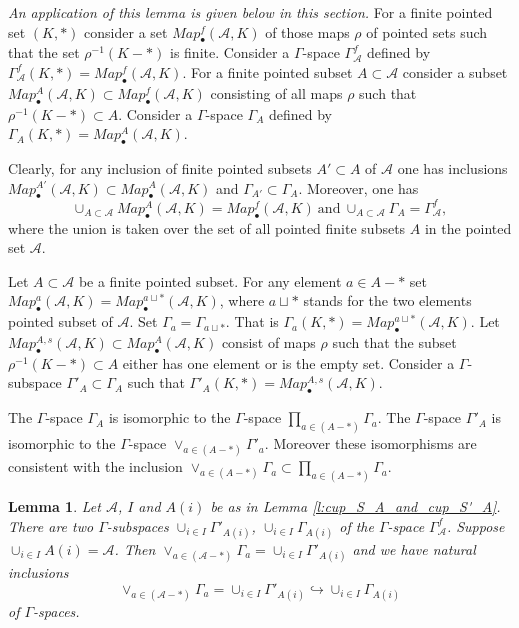 \documentclass[a4paper,11pt,reqno]{amsart}
\newtheorem{lemma}[theorem]{Lemma}
\begin{document}
{\it An application of this lemma is given below in this section.}
For a finite pointed set $(K,*)$ consider a set
$Map^f_\bullet(\mathcal A,K)$
of those maps $\rho$ of pointed sets such that the set $\rho^{-1}(K-*)$ is finite.
Consider a $\Gamma$-space $\Gamma^f_{\mathcal A}$ defined by
$\Gamma^f_{\mathcal A}(K,*)=Map^f_\bullet(\mathcal A,K)$.
For a finite pointed subset $A\subset \mathcal A$ consider a subset
$Map^A_\bullet(\mathcal A,K)\subset Map^f_\bullet(\mathcal A,K)$
consisting of all maps $\rho$ such that $\rho^{-1}(K-*)\subset A$.
Consider a $\Gamma$-space $\Gamma_{A}$ defined by
$\Gamma_{A}(K,*)=Map^A_\bullet(\mathcal A,K)$.

Clearly, for any inclusion of finite pointed subsets $A'\subset A$ of $\mathcal A$ one has inclusions
$Map^{A'}_\bullet(\mathcal A,K)\subset Map^A_\bullet(\mathcal A,K)$
and $\Gamma_{A'}\subset \Gamma_{A}$. Moreover, one has
   $$\cup_{A\subset \mathcal A}Map^A_\bullet(\mathcal A,K)=Map^f_\bullet(\mathcal A,K) \ \text{and} \
\cup_{A\subset \mathcal A}\Gamma_{A}=\Gamma^f_{\mathcal A},$$
where the union is taken over the set of all pointed finite subsets $A$ in the pointed set
$\mathcal A$.

Let $A\subset \mathcal A$ be a finite pointed subset. For any element
$a\in A-*$ set $Map^a_\bullet(\mathcal A,K)=Map^{a\sqcup *}_\bullet(\mathcal A,K)$,
where $a\sqcup *$ stands for the two elements pointed subset of $\mathcal A$.
Set $\Gamma_a=\Gamma_{a\sqcup *}$. That is
$\Gamma_{a}(K,*)=Map^{a\sqcup *}_\bullet(\mathcal A,K)$.
Let $Map^{A,s}_\bullet(\mathcal A,K)\subset Map^A_\bullet(\mathcal A,K)$
consist of maps $\rho$
such that the subset $\rho^{-1}(K-*)\subset A$ either has one element or is the empty set.
Consider a $\Gamma$-subspace $\Gamma'_{A}\subset \Gamma_{A}$ such that
$\Gamma'_{A}(K,*)=Map^{A,s}_\bullet(\mathcal A,K)$.

The $\Gamma$-space $\Gamma_{A}$ is isomorphic to the $\Gamma$-space
$\prod_{a\in (A-*)}\Gamma_a$. The $\Gamma$-space $\Gamma'_{A}$ is isomorphic to the $\Gamma$-space $\vee_{a\in (A-*)}\Gamma'_a$. Moreover these isomorphisms are consistent with the inclusion $\vee_{a\in (A-*)}\Gamma_a \subset \prod_{a\in (A-*)}\Gamma_a$.

\begin{lemma}\label{l:cup_G_A_and_cup_G'_A}
Let $\mathcal A$, $I$ and $A(i)$ be as in Lemma
\ref{l:cup_S_A_and_cup_S'_A}.
There are two $\Gamma$-subspaces $\cup_{i\in I}\Gamma'_{A(i)}$,
$\cup_{i\in I}\Gamma_{A(i)}$ of the $\Gamma$-space $\Gamma^f_{\mathcal A}$.
Suppose $\cup_{i\in I}A(i)=\mathcal A$. Then
$\vee_{a \in (\mathcal A-*)}\Gamma_a=\cup_{i\in I}\Gamma'_{A(i)}$ and we have natural inclusions
$$\vee_{a\in (\mathcal A-*)}\Gamma_a=\cup_{i\in I}\Gamma'_{A(i)} \hookrightarrow \cup_{i\in I}\Gamma_{A(i)}$$
of $\Gamma$-spaces.
\end{lemma}
\end{document}
